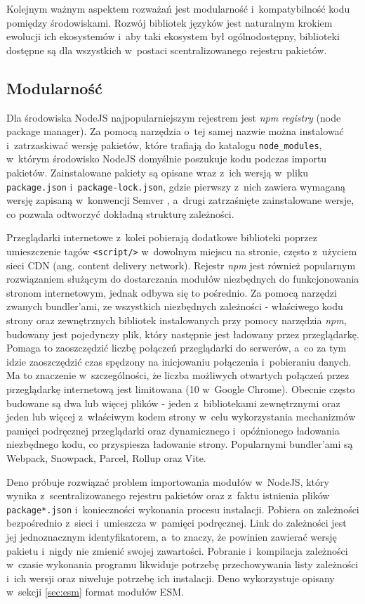 Kolejnym ważnym aspektem rozważań jest modularność i~kompatybilność kodu pomiędzy środowiskami. Rozwój bibliotek języków jest naturalnym krokiem ewolucji ich ekosystemów i~aby taki ekosystem był ogólnodostępny, biblioteki dostępne są dla wszystkich w~postaci scentralizowanego rejestru pakietów. 

\subsection{Modularność}

Dla środowiska NodeJS najpopularniejszym rejestrem jest \textit{npm registry} (node package manager). Za pomocą narzędzia o~tej samej nazwie można instalować i~zatrzaskiwać wersję pakietów, które trafiają do katalogu \lstinline{node_modules}, w~którym środowisko NodeJS domyślnie poszukuje kodu podczas importu pakietów. Zainstalowane pakiety są opisane wraz z~ich wersją w~pliku \mbox{\lstinline{package.json}} i~\lstinline{package-lock.json}, gdzie pierwszy z~nich zawiera wymaganą wersję zapisaną w~konwencji Semver \cite{semver}, a~drugi zatrzaśnięte zainstalowane wersje, co pozwala odtworzyć dokładną strukturę zależności.

Przeglądarki internetowe z~kolei pobierają dodatkowe biblioteki poprzez umieszczenie tagów \lstinline{<script/>} w~dowolnym miejscu na stronie, często z~użyciem sieci CDN (ang. content delivery network). Rejestr \textit{npm} jest również popularnym rozwiązaniem służącym do dostarczania modułów niezbędnych do funkcjonowania stronom internetowym, jednak odbywa się to pośrednio. Za pomocą narzędzi zwanych bundler'ami, ze wszystkich niezbędnych zależności - właściwego kodu strony oraz zewnętrznych bibliotek instalowanych przy pomocy narzędzia \textit{npm}, budowany jest pojedynczy plik, który następnie jest ładowany przez przeglądarkę. Pomaga to zaoszczędzić liczbę połączeń przeglądarki do serwerów, a~co za tym idzie zaoszczędzić czas spędzony na inicjowaniu połączenia i~pobieraniu danych. Ma to znaczenie w~szczególności, że liczba możliwych otwartych połączeń przez przeglądarkę internetową jest limitowana (10 w~Google Chrome). Obecnie często  budowane są dwa lub więcej plików - jeden z~bibliotekami zewnętrznymi oraz jeden lub więcej z~właściwym kodem strony w~celu wykorzystania mechanizmów pamięci podręcznej przeglądarki oraz dynamicznego i~opóźnionego ładowania niezbędnego kodu, co przyspiesza ładowanie strony. Popularnymi bundler'ami są Webpack, Snowpack, Parcel, Rollup oraz Vite.

Deno próbuje rozwiązać problem importowania modułów w~NodeJS, który wynika z~scentralizowanego rejestru pakietów oraz z~faktu istnienia plików \lstinline{package*.json} i~konieczności wykonania procesu instalacji. Pobiera on zależności bezpośrednio z~sieci i~umieszcza w~pamięci podręcznej. Link do zależności jest jej jednoznacznym identyfikatorem, a~to znaczy, że powinien zawierać wersję pakietu i~nigdy nie zmienić swojej zawartości. Pobranie i~kompilacja zależności w~czasie wykonania programu likwiduje potrzebę przechowywania listy zależności i~ich wersji oraz niweluje potrzebę ich instalacji. Deno wykorzystuje opisany w~sekcji \ref{sec:esm} format modułów ESM.

